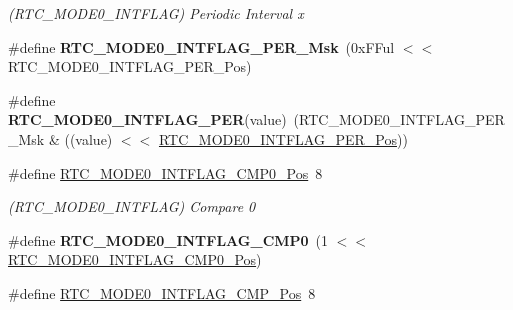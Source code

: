 \begin{DoxyCompactItemize}
\begin{DoxyCompactList}\small\item\em (R\+T\+C\+\_\+\+M\+O\+D\+E0\+\_\+\+I\+N\+T\+F\+L\+A\+G) Periodic Interval x \end{DoxyCompactList}\item 
\hypertarget{group___s_a_m_l21___r_t_c_gae67efdbf07a7379545d650b0ab6a9379}{}\#define {\bfseries R\+T\+C\+\_\+\+M\+O\+D\+E0\+\_\+\+I\+N\+T\+F\+L\+A\+G\+\_\+\+P\+E\+R\+\_\+\+Msk}~(0x\+F\+Ful $<$$<$ R\+T\+C\+\_\+\+M\+O\+D\+E0\+\_\+\+I\+N\+T\+F\+L\+A\+G\+\_\+\+P\+E\+R\+\_\+\+Pos)\label{group___s_a_m_l21___r_t_c_gae67efdbf07a7379545d650b0ab6a9379}

\item 
\hypertarget{group___s_a_m_l21___r_t_c_ga0c449224ce5e88e18bbce8e375056323}{}\#define {\bfseries R\+T\+C\+\_\+\+M\+O\+D\+E0\+\_\+\+I\+N\+T\+F\+L\+A\+G\+\_\+\+P\+E\+R}(value)~(R\+T\+C\+\_\+\+M\+O\+D\+E0\+\_\+\+I\+N\+T\+F\+L\+A\+G\+\_\+\+P\+E\+R\+\_\+\+Msk \& ((value) $<$$<$ \hyperlink{group___s_a_m_l21___r_t_c_gab3ad2d8327b7398d360361c844daa4d8}{R\+T\+C\+\_\+\+M\+O\+D\+E0\+\_\+\+I\+N\+T\+F\+L\+A\+G\+\_\+\+P\+E\+R\+\_\+\+Pos}))\label{group___s_a_m_l21___r_t_c_ga0c449224ce5e88e18bbce8e375056323}

\item 
\hypertarget{group___s_a_m_l21___r_t_c_ga79c0e8136c7f52ba4d7dd74900f9c096}{}\#define \hyperlink{group___s_a_m_l21___r_t_c_ga79c0e8136c7f52ba4d7dd74900f9c096}{R\+T\+C\+\_\+\+M\+O\+D\+E0\+\_\+\+I\+N\+T\+F\+L\+A\+G\+\_\+\+C\+M\+P0\+\_\+\+Pos}~8\label{group___s_a_m_l21___r_t_c_ga79c0e8136c7f52ba4d7dd74900f9c096}

\begin{DoxyCompactList}\small\item\em (R\+T\+C\+\_\+\+M\+O\+D\+E0\+\_\+\+I\+N\+T\+F\+L\+A\+G) Compare 0 \end{DoxyCompactList}\item 
\hypertarget{group___s_a_m_l21___r_t_c_gafd4fd25be5a0ba51b7eb783af1f59cf3}{}\#define {\bfseries R\+T\+C\+\_\+\+M\+O\+D\+E0\+\_\+\+I\+N\+T\+F\+L\+A\+G\+\_\+\+C\+M\+P0}~(1 $<$$<$ \hyperlink{group___s_a_m_l21___r_t_c_ga79c0e8136c7f52ba4d7dd74900f9c096}{R\+T\+C\+\_\+\+M\+O\+D\+E0\+\_\+\+I\+N\+T\+F\+L\+A\+G\+\_\+\+C\+M\+P0\+\_\+\+Pos})\label{group___s_a_m_l21___r_t_c_gafd4fd25be5a0ba51b7eb783af1f59cf3}

\item 
\hypertarget{group___s_a_m_l21___r_t_c_gac0320bb38db6d1e4ae60040c73789f33}{}\#define \hyperlink{group___s_a_m_l21___r_t_c_gac0320bb38db6d1e4ae60040c73789f33}{R\+T\+C\+\_\+\+M\+O\+D\+E0\+\_\+\+I\+N\+T\+F\+L\+A\+G\+\_\+\+C\+M\+P\+\_\+\+Pos}~8\label{group___s_a_m_l21___r_t_c_gac0320bb38db6d1e4ae60040c73789f33}


\end{DoxyCompactItemize}
